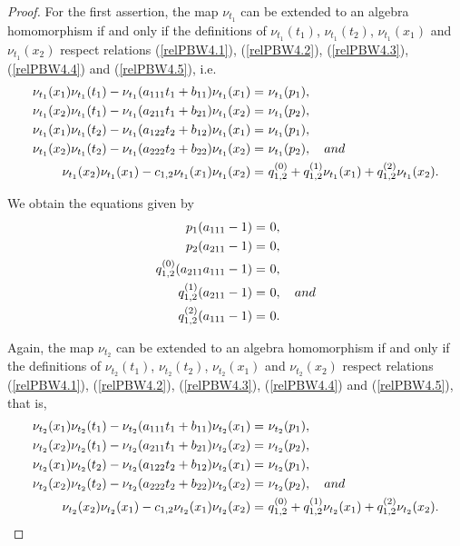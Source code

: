\documentclass{amsart}
\theoremstyle{definition}
\theoremstyle{remark}
\numberwithin{equation}{section}
\begin{document}
\begin{proof}
For the first assertion, the map $\nu_{t_1}$ can be extended to an algebra homomorphism if and only if the definitions of $\nu_{t_1}(t_1)$, $\nu_{t_1}(t_2)$,  $\nu_{t_1}(x_1)$ and $\nu_{t_1}(x_2)$ respect relations {\rm (}\ref{relPBW4.1}{\rm )}, {\rm (}\ref{relPBW4.2}{\rm )}, {\rm (}\ref{relPBW4.3}{\rm )}, {\rm (}\ref{relPBW4.4}{\rm )} and {\rm (}\ref{relPBW4.5}{\rm )}, i.e.
\begin{align*}
   \nu_{t_1}(x_1)\nu_{t_1}(t_1)-\nu_{t_1}(a_{111}t_1+b_{11})\nu_{t_1}(x_1) = &\ \nu_{t_1}(p_1), \\
   \nu_{t_1}(x_2)\nu_{t_1}(t_1)-\nu_{t_1}(a_{211}t_1+b_{21})\nu_{t_1}(x_2) = &\ \nu_{t_1}(p_2), \\
   \nu_{t_1}(x_1)\nu_{t_1}(t_2)-\nu_{t_1}(a_{122}t_2+b_{12})\nu_{t_1}(x_1) = &\ \nu_{t_1}(p_1), \\
    \nu_{t_1}(x_2)\nu_{t_1}(t_2)-\nu_{t_1}(a_{222}t_2+b_{22})\nu_{t_1}(x_2) = &\ \nu_{t_1}(p_2), \quad {\rm and} \\
    \nu_{t_1}(x_2)\nu_{t_1}(x_1)-c_{1,2}\nu_{t_1}(x_1)\nu_{t_1}(x_2) = &\ q_{1,2}^{(0)}+q_{1,2}^{(1)}\nu_{t_1}(x_1)+q_{1,2}^{(2)}\nu_{t_1}(x_2).
\end{align*}

We obtain the equations given by
\begin{align}
p_1(a_{111}-1) = &\ 0, \notag \\
p_2(a_{211}-1) = &\ 0, \notag \\
q_{1,2}^{(0)}(a_{211}a_{111}-1) = &\ 0, \label{firstsecondrel2} \\
q_{1,2}^{(1)}(a_{211}-1) = &\ 0, \quad {\rm and} \\
q_{1,2}^{(2)}(a_{111}-1) = &\ 0. \notag 
\end{align}

Again, the map $\nu_{t_2}$ can be extended to an algebra homomorphism if and only if the definitions of $\nu_{t_2}(t_1)$, $\nu_{t_2}(t_2)$,  $\nu_{t_2}(x_1)$ and $\nu_{t_2}(x_2)$ respect relations {\rm (}\ref{relPBW4.1}{\rm )}, {\rm (}\ref{relPBW4.2}{\rm )}, {\rm (}\ref{relPBW4.3}{\rm )}, {\rm (}\ref{relPBW4.4}{\rm )} and {\rm (}\ref{relPBW4.5}{\rm )}, that is, 
\begin{align*}
   \nu_{t_2}(x_1)\nu_{t_2}(t_1)-\nu_{t_2}(a_{111}t_1+b_{11})\nu_{t_2}(x_1) = &\ \nu_{t_2}(p_1), \\
   \nu_{t_2}(x_2)\nu_{t_2}(t_1)-\nu_{t_2}(a_{211}t_1+b_{21})\nu_{t_2}(x_2) = &\ \nu_{t_2}(p_2), \\
   \nu_{t_2}(x_1)\nu_{t_2}(t_2)-\nu_{t_2}(a_{122}t_2+b_{12})\nu_{t_2}(x_1) = &\ \nu_{t_2}(p_1), \\
    \nu_{t_2}(x_2)\nu_{t_2}(t_2)-\nu_{t_2}(a_{222}t_2+b_{22})\nu_{t_2}(x_2) = &\ \nu_{t_2}(p_2), \quad {\rm and} \\
    \nu_{t_2}(x_2)\nu_{t_2}(x_1)-c_{1,2}\nu_{t_2}(x_1)\nu_{t_2}(x_2) = &\ q_{1,2}^{(0)}+q_{1,2}^{(1)}\nu_{t_2}(x_1)+q_{1,2}^{(2)}\nu_{t_2}(x_2).
\end{align*}


\end{proof}
\end{document}
